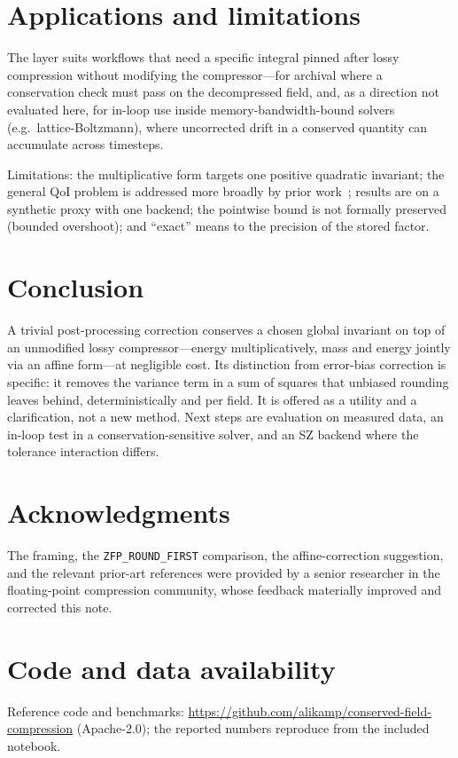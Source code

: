 \documentclass[11pt]{article}
\begin{document}
\section{Applications and limitations}
The layer suits workflows that need a specific integral pinned after lossy
compression without modifying the compressor---for archival where a
conservation check must pass on the decompressed field, and, as a direction not
evaluated here, for in-loop use inside memory-bandwidth-bound solvers (e.g.\
lattice-Boltzmann), where uncorrected drift in a conserved quantity can
accumulate across timesteps.

Limitations: the multiplicative form targets one positive quadratic invariant;
the general QoI problem is addressed more broadly by prior work~\cite{qoi};
results are on a synthetic proxy with one backend; the pointwise bound is not
formally preserved (bounded overshoot); and ``exact'' means to the precision of
the stored factor.

\section{Conclusion}
A trivial post-processing correction conserves a chosen global invariant on top
of an unmodified lossy compressor---energy multiplicatively, mass and energy
jointly via an affine form---at negligible cost. Its distinction from error-bias
correction is specific: it removes the variance term in a sum of squares that
unbiased rounding leaves behind, deterministically and per field. It is offered
as a utility and a clarification, not a new method. Next steps are evaluation on
measured data, an in-loop test in a conservation-sensitive solver, and an SZ
backend where the tolerance interaction differs.

\section*{Acknowledgments}
The framing, the \texttt{ZFP\_ROUND\_FIRST} comparison, the affine-correction
suggestion, and the relevant prior-art references were provided by a senior
researcher in the floating-point compression community, whose feedback
materially improved and corrected this note.

\section*{Code and data availability}
Reference code and benchmarks:
\url{https://github.com/alikamp/conserved-field-compression} (Apache-2.0);
the reported numbers reproduce from the included notebook.
\end{document}
